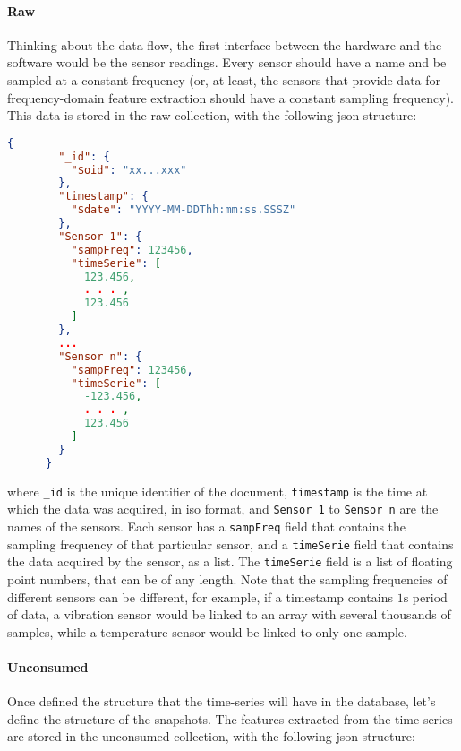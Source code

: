 \paragraph{Raw}
Thinking about the data flow, the first interface between the hardware and the software would be the sensor readings. Every sensor should have a name and be sampled at a constant frequency (or, at least, the sensors that provide data for frequency-domain feature extraction should have a constant sampling frequency). This data is stored in the {raw} collection, with the following \gls{json} structure:
\begin{lstlisting}[language=json,firstnumber=1]
    {
        "_id": {
          "$oid": "xx...xxx"
        },
        "timestamp": {
          "$date": "YYYY-MM-DDThh:mm:ss.SSSZ"
        },
        "Sensor 1": {
          "sampFreq": 123456,
          "timeSerie": [
            123.456,
            . . . ,
            123.456
          ]
        },
        ...
        "Sensor n": {
          "sampFreq": 123456,
          "timeSerie": [
            -123.456,
            . . . ,
            123.456
          ]
        }
      }
\end{lstlisting}
where \texttt{\_id} is the unique identifier of the document, \texttt{timestamp} is the time at which the data was acquired, in \gls{iso} format, and \texttt{Sensor 1} to \texttt{Sensor n} are the names of the sensors. Each sensor has a \texttt{sampFreq} field that contains the sampling frequency of that particular sensor, and a \texttt{timeSerie} field that contains the data acquired by the sensor, as a list. The \texttt{timeSerie} field is a list of floating point numbers, that can be of any length. Note that the sampling frequencies of different sensors can be different, for example, if a timestamp contains $1\si{\s}$ period of data, a vibration sensor would be linked to an array with several thousands of samples, while a temperature sensor would be linked to only one sample.

\paragraph{Unconsumed}
Once defined the structure that the time-series will have in the database, let's define the structure of the snapshots. The features extracted from the time-series are stored in the {unconsumed} collection, with the following \gls{json} structure:

